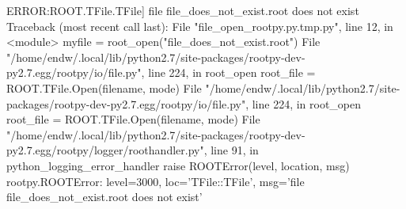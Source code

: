 \begin{footnotesize}
\begin{pyglist}[language=text,texcl=true,abovecaptionskip=0,style=bw]
ERROR:ROOT.TFile.TFile] file file_does_not_exist.root does not exist
Traceback (most recent call last):
  File "file_open_rootpy.py.tmp.py", line 12, in <module>
    myfile = root_open("file_does_not_exist.root")
  File "/home/endw/.local/lib/python2.7/site-packages/rootpy-dev-py2.7.egg/rootpy/io/file.py", line 224, in root_open
    root_file = ROOT.TFile.Open(filename, mode)
  File "/home/endw/.local/lib/python2.7/site-packages/rootpy-dev-py2.7.egg/rootpy/io/file.py", line 224, in root_open
    root_file = ROOT.TFile.Open(filename, mode)
  File "/home/endw/.local/lib/python2.7/site-packages/rootpy-dev-py2.7.egg/rootpy/logger/roothandler.py", line 91, in python_logging_error_handler
    raise ROOTError(level, location, msg)
rootpy.ROOTError: level=3000, loc='TFile::TFile', msg='file file_does_not_exist.root does not exist'
\end{pyglist}
\end{footnotesize}
